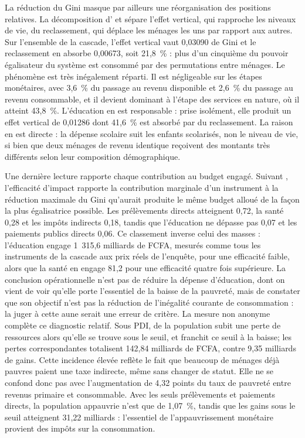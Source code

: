 \documentclass[11pt,a4paper]{article}
\begin{document}
La réduction du Gini masque par ailleurs une réorganisation des positions
relatives. La décomposition d'\citet{atkinson1980} et \citet{plotnick1981} sépare
l'effet vertical, qui rapproche les niveaux de vie, du reclassement, qui déplace
les ménages les uns par rapport aux autres. Sur l'ensemble de la cascade, l'effet
vertical vaut 0,03090 de Gini et le reclassement en absorbe 0,00673, soit
21,8~\% : plus d'un cinquième du pouvoir égalisateur du système est consommé par
des permutations entre ménages. Le phénomène est très inégalement réparti. Il est
négligeable sur les étapes monétaires, avec 3,6~\% du passage au revenu
disponible et 2,6~\% du passage au revenu consommable, et il devient dominant à
l'étape des services en nature, où il atteint 43,8~\%. L'éducation en est
responsable : prise isolément, elle produit un effet vertical de 0,01286 dont
41,6~\% est absorbé par du reclassement. La raison en est directe : la dépense
scolaire suit les enfants scolarisés, non le niveau de vie, si bien que deux
ménages de revenu identique reçoivent des montants très différents selon leur
composition démographique.

Une dernière lecture rapporte chaque contribution au budget engagé. Suivant
\citet{enami2022}, l'efficacité d'impact rapporte la contribution marginale d'un
instrument à la réduction maximale du Gini qu'aurait produite le même budget
alloué de la façon la plus égalisatrice possible. Les prélèvements directs
atteignent 0,72, la santé 0,28 et les impôts indirects 0,18, tandis que
l'éducation ne dépasse pas 0,07 et les paiements publics directs 0,06. Ce
classement inverse celui des masses : l'éducation engage 1~315,6 milliards de
FCFA, mesurés comme tous les instruments de la cascade aux prix réels de
l'enquête, pour une efficacité faible, alors que la santé en engage 81,2 pour
une efficacité quatre fois supérieure. La conclusion opérationnelle n'est pas de
réduire la dépense d'éducation, dont on vient de voir qu'elle porte l'essentiel
de la baisse de la pauvreté, mais de constater que son objectif n'est pas la
réduction de l'inégalité courante de consommation : la juger à cette aune serait
une erreur de critère.
La mesure non anonyme complète ce diagnostic relatif. Sous PDI, \PartAppauvrie{} de la
population subit une perte de ressources alors qu'elle se trouve sous le seuil,
et \PartNouveauxPauvres{} franchit ce seuil à la baisse; les pertes correspondantes totalisent
142,84 milliards de FCFA, contre 9,35 milliards de gains. Cette incidence élevée
reflète le fait que beaucoup de ménages déjà pauvres paient une taxe indirecte,
même sans changer de statut. Elle ne se confond donc pas avec l'augmentation de
4,32 points du taux de pauvreté entre revenus primaire et consommable. Avec les
seuls prélèvements et paiements directs, la population appauvrie n'est que de
1,07~\%, tandis que les gains sous le seuil atteignent 31,22 milliards :
l'essentiel de l'appauvrissement monétaire provient des impôts sur la
consommation.
\end{document}
